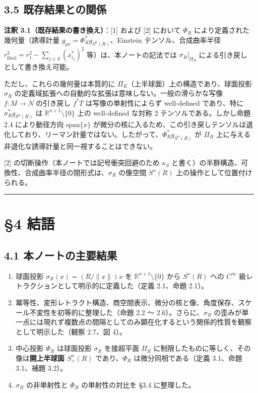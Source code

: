 \documentclass[
]{ltjsarticle}
\providecommand{\tightlist}{%
  \setlength{\itemsep}{0pt}\setlength{\parskip}{0pt}}
\begin{document}
\subsection{3.5
既存結果との関係}\label{ux65e2ux5b58ux7d50ux679cux3068ux306eux95a2ux4fc2}

\textbf{注釈 3.1（既存結果の書き換え）}：{[}1{]} および {[}2{]} において
\(\Phi_R\) により定義された幾何量（誘導計量
\(g_{\mu\nu} = \Phi_R^* g_{S^n(R)}\)、Einstein テンソル、合成曲率半径
\(r_{\text{final}}^2 = r_1^2 - \sum_{j \in S}(x_{i_j}^*)^2\)
等）は、本ノートの記法では \(\sigma_R \big|_{\Pi_R}\)
による引き戻しとして書き換え可能。

ただし、これらの幾何量は本質的に
\(\Pi_R\)（上半球面）上の構造であり、球面投影 \(\sigma_R\)
の定義域拡張への自動的な拡張は意味しない。一般の滑らかな写像
\(f: M \to N\) の引き戻し \(f^* T\) は写像の単射性によらず well-defined
であり、特に \(\sigma_R^* g_{S^n(R)}\) は
\(\mathbb{R}^{n+1} \setminus \{0\}\) 上の well-defined な対称 2
テンソルである。しかし命題 2.4 により動径方向 \(\mathrm{span}\{x\}\)
が微分の核に入るため、この引き戻しテンソルは退化しており、リーマン計量ではない。したがって、\(\Phi_R^* g_{S^n(R)}\)
が \(\Pi_R\) 上に与える非退化な誘導計量と同一視することはできない。

{[}2{]} の切断操作（本ノートでは記号衝突回避のため \(\kappa_S\)
と書く）の半群構造、可換性、合成曲率半径の閉形式は、\(\sigma_R\)
の像空間 \(S^n(R)\) 上の操作として位置付けられる。

\begin{center}\rule{0.5\linewidth}{0.5pt}\end{center}

\section{§4 結語}\label{ux7d50ux8a9e}

\subsection{4.1
本ノートの主要結果}\label{ux672cux30ceux30fcux30c8ux306eux4e3bux8981ux7d50ux679c}

\begin{enumerate}
\def\labelenumi{\arabic{enumi}.}
\tightlist
\item
  球面投影 \(\sigma_R(x) = (R/\|x\|) x\) を
  \(\mathbb{R}^{n+1} \setminus \{0\}\) から \(S^n(R)\) への \(C^\infty\)
  級レトラクションとして明示的に定義した（定義 2.1、命題 2.1）。
\item
  冪等性、変形レトラクト構造、商空間表示、微分の核と像、角度保存、スケール不変性を初等的に整理した（命題
  2.2 〜 2.6）。さらに、\(\sigma_R\)
  の歪みが単一点には現れず複数点の間隔としてのみ顕在化するという関係的性質を観察として明示した（観察
  2.7、図 4）。
\item
  中心投影 \(\Phi_R\) は球面投影 \(\sigma_R\) を接超平面 \(\Pi_R\)
  に制限したものに等しく、その像は\textbf{開上半球面 \(S^n_+(R)\)}
  であり、\(\Phi_R\) は微分同相である（定義 3.1、命題 3.1、補題 3.2）。
\item
  \(\sigma_R\) の非単射性と \(\Phi_R\) の単射性の対比を §3.4
  に整理した。
\end{enumerate}
\end{document}
